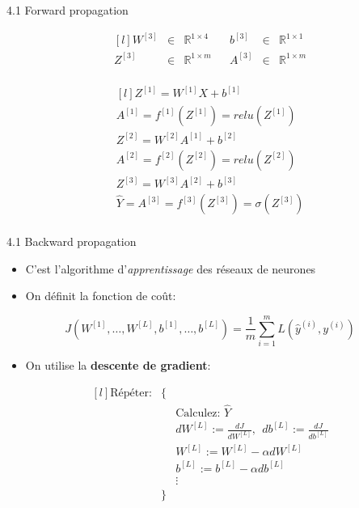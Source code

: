 \begin{frame}{4.1 Forward propagation}
\begin{minipage}{0.59\textwidth}
\begin{equation*}
\begin{matrix*}[l]
        W^{[3]} & \in & \mathbb{R}^{1 \times 4} & & b^{[3]} & \in & \mathbb{R}^{1 \times 1}\\
        Z^{[3]} & \in & \mathbb{R}^{1 \times m} & & A^{[3]} & \in & \mathbb{R}^{1 \times m}\\
      \end{matrix*}
    \end{equation*}
  \end{minipage}
  \begin{minipage}{0.39\textwidth}
    \begin{equation*}
      \begin{matrix*}[l]
        Z^{[1]} = W^{[1]} X + b^{[1]}\\
        A^{[1]} = f^{[1]}(Z^{[1]}) = relu(Z^{[1]})\\
        Z^{[2]} = W^{[2]} A^{[1]} + b^{[2]}\\
        A^{[2]} = f^{[2]}(Z^{[2]}) = relu(Z^{[2]})\\
        Z^{[3]} = W^{[3]} A^{[2]} + b^{[3]}\\
        \hat{Y} = A^{[3]} = f^{[3]}(Z^{[3]}) = \sigma(Z^{[3]})\\
      \end{matrix*}
    \end{equation*}
  \end{minipage}
\end{frame}

\begin{frame}{4.1 Backward propagation}
  \begin{itemize}
  \item C'est l'algorithme d'\textit{apprentissage} des réseaux de neurones
  \item On définit la fonction de coût:
  \end{itemize} 
  \begin{equation*}
    J(W^{[1]},\dots,W^{[L]},b^{[1]},\dots,b^{[L]}) = \frac{1}{m}\displaystyle\sum_{i=1}^{m}L(\hat{y}^{(i)},y^{(i)})
  \end{equation*}
  \vspace{-0.5cm}
  \begin{itemize}
  \item On utilise la \textbf{descente de gradient}:
  \end{itemize}
  \begin{equation*}
    \begin{matrix*}[l]
      \text{Répéter:} & \{ & \\ & & \text{Calculez: } \hat{Y} \\ & & dW^{[L]} := \frac{dJ}{dW^{[L]}}, ~~ db^{[L]} := \frac{dJ}{db^{[L]}}\\ & & W^{[L]} := W^{[L]} - \alpha dW^{[L]} \\ & & b^{[L]} := b^{[L]} - \alpha db^{[L]} \\ & & \vdots \\ & \} &
    \end{matrix*}
  \end{equation*}
\end{frame}


